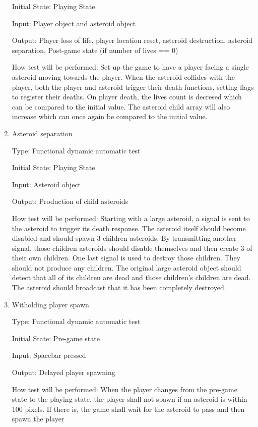 \documentclass[12pt, titlepage]{article}
\begin{document}
\begin{enumerate}
Initial State: Playing State

Input: Player object and asteroid object

Output: Player loss of life, player location reset, asteroid destruction, asteroid separation, Post-game state (if number of lives == 0)

How test will be performed: Set up the game to have a player facing a single asteroid moving towards the player. When the asteroid collides with the player, both the player and asteroid trigger their death functions, setting flags to register their deaths. On player death, the lives count is decresed which can be compared to the initial value. The asteroid child array will also increase which can once again be compared to the initial value.

\item{Asteroid separation\\}

Type: Functional dynamic automatic test

Initial State: Playing State

Input: Asteroid object

Output: Production of child asteroids

How test will be performed: Starting with a large asteroid, a signal is sent to the asteroid to trigger its death response. The asteroid itself should become disabled and should spawn 3 children asteroids. By transmitting another signal, those children asteroids should disable themselves and then create 3 of their own children. One last signal is used to destroy those children. They should not produce any children. The original large asteroid object should detect that all of its children are dead and those children's children are dead. The asteroid should broadcast that it has been completely destroyed.

\item{Witholding player spawn\\}

Type: Functional dynamic automatic test

Initial State: Pre-game state

Input: Spacebar pressed

Output: Delayed player spawning

How test will be performed: When the player changes from the pre-game state to the playing state, the player shall not spawn if an asteroid is within 100 pixels. If there is, the game shall wait for the asteroid to pass and then spawn the player

\end{enumerate}
\end{document}
